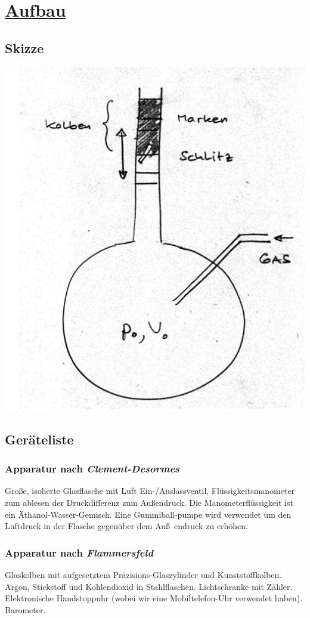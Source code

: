 \documentclass[11pt,a4paper]{article}
\begin{document}
  \section{\underline{Aufbau}}
  \subsection{Skizze}
  \includegraphics{skizzeIsentropenindex.png}
  \subsection{Ger\"ateliste}
  \subsubsection{Apparatur nach \itshape{Clement-Desormes}\/}
  Gro{\ss}e, isolierte Glasflasche mit Luft Ein-/Auslassventil,
  Fl\"ussigkeitsmanometer zum ablesen der Druckdifferenz zum Au{\ss}endruck. Die 
  Manometerfl\"ussigkeit ist ein \"Athanol-Wasser-Gemisch. Eine Gummiball-pumpe
  wird verwendet um den Luftdruck in der Flasche gegen\"uber dem Au\ss~endruck zu 
  erh\"ohen.
  \subsubsection{Apparatur nach \itshape{Flammersfeld}\/}
  Glaskolben mit aufgesetztem Pr\"azisions-Glaszylinder und Kunststoffkolben. Argon, 
  Stickstoff und Kohlendioxid in Stahlflaschen. Lichtschranke mit Z\"ahler. Elektronische
  Handstoppuhr (wobei wir eine Mobiltelefon-Uhr verwendet haben). Barometer.
\end{document}

